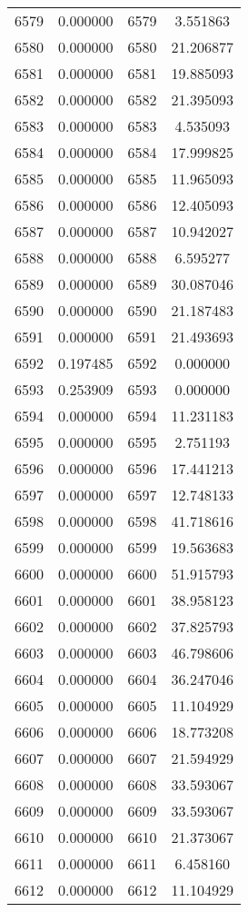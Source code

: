 \documentclass[12pt]{article}
\begin{document}
\begin{longtable}{@{}cccc@{}}
6579 & 0.000000 & 6579 & 3.551863 \\
6580 & 0.000000 & 6580 & 21.206877 \\
6581 & 0.000000 & 6581 & 19.885093 \\
6582 & 0.000000 & 6582 & 21.395093 \\
6583 & 0.000000 & 6583 & 4.535093 \\
6584 & 0.000000 & 6584 & 17.999825 \\
6585 & 0.000000 & 6585 & 11.965093 \\
6586 & 0.000000 & 6586 & 12.405093 \\
6587 & 0.000000 & 6587 & 10.942027 \\
6588 & 0.000000 & 6588 & 6.595277 \\
6589 & 0.000000 & 6589 & 30.087046 \\
6590 & 0.000000 & 6590 & 21.187483 \\
6591 & 0.000000 & 6591 & 21.493693 \\
6592 & 0.197485 & 6592 & 0.000000 \\
6593 & 0.253909 & 6593 & 0.000000 \\
6594 & 0.000000 & 6594 & 11.231183 \\
6595 & 0.000000 & 6595 & 2.751193 \\
6596 & 0.000000 & 6596 & 17.441213 \\
6597 & 0.000000 & 6597 & 12.748133 \\
6598 & 0.000000 & 6598 & 41.718616 \\
6599 & 0.000000 & 6599 & 19.563683 \\
6600 & 0.000000 & 6600 & 51.915793 \\
6601 & 0.000000 & 6601 & 38.958123 \\
6602 & 0.000000 & 6602 & 37.825793 \\
6603 & 0.000000 & 6603 & 46.798606 \\
6604 & 0.000000 & 6604 & 36.247046 \\
6605 & 0.000000 & 6605 & 11.104929 \\
6606 & 0.000000 & 6606 & 18.773208 \\
6607 & 0.000000 & 6607 & 21.594929 \\
6608 & 0.000000 & 6608 & 33.593067 \\
6609 & 0.000000 & 6609 & 33.593067 \\
6610 & 0.000000 & 6610 & 21.373067 \\
6611 & 0.000000 & 6611 & 6.458160 \\
6612 & 0.000000 & 6612 & 11.104929 \\

\end{longtable}
\end{document}
